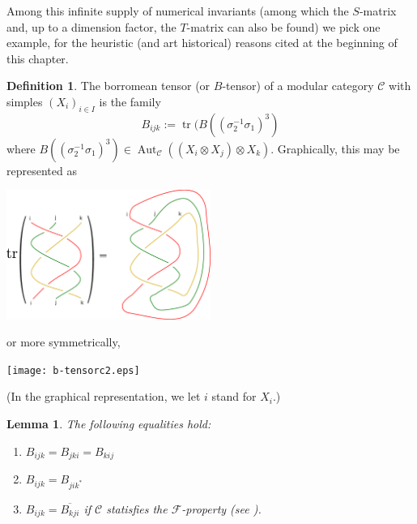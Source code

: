 \documentclass[a4paper, 10pt]{book}
\newtheorem{Lem}[theorem]{Lemma}
\theoremstyle{definition}
\newtheorem{Def}[theorem]{Definition}
\numberwithin{equation}{chapter}
\newcommand\tr{\operatorname{tr}}
\newcommand\inv{^{-1}}
\newcommand\ot{\otimes}
\newcommand\Aut{\operatorname{Aut}}
\newcommand\C{\mathcal C}
\begin{document}
Among this infinite supply of numerical invariants (among which the $S$-matrix and, up to a dimension factor, the $T$-matrix can also be found) we pick one example, for the heuristic (and art historical) reasons cited at the beginning of this chapter.

\begin{Def}
  The borromean tensor (or $B$-tensor) of a modular category $\C$ with simples $(X_i)_{i\in I}$ is the family
  \begin{equation}
    \label{eq:borromeo}
    B_{ijk}:=\tr(B((\sigma_2\inv\sigma_1)^3)
  \end{equation}
  where $B((\sigma_2\inv\sigma_1)^3)\in\Aut_{\C}((X_i\ot X_j)\ot X_k)$. Graphically, this may be represented as 
\begin{center}
\includegraphics[width=0.5\textwidth]{b-braid.eps}
\end{center}
or more symmetrically, 

\begin{center}
\texttt{[image: b-tensorc2.eps]}
\end{center}

(In the graphical representation, we let $i$ stand for $X_i$.)
\end{Def}
\begin{Lem}
 The following equalities hold:
\begin{enumerate}
\item
$B_{ijk}=B_{jki}=B_{kij}$
\item
$B_{ijk}=B_{jik^{\ast}}$
\item
$B_{ijk}=\overline{B_{kji}}$ if $\C$ statisfies the $\mathcal F$-property (see \cite{MR2832261}).
\end{enumerate}
\end{Lem}
\end{document}
